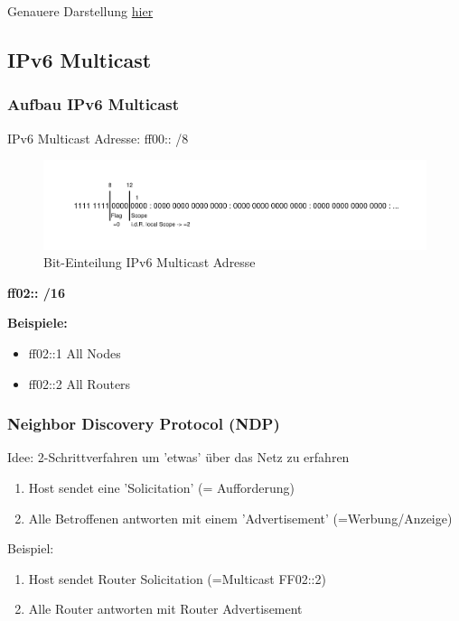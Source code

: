 \documentclass[10pt]{article}
\begin{document}
Genauere Darstellung \href{https://www.internex.at/de/toolbox/ipv6/ip6=fd00:1:2::/prefix=52/subnetNo=16}{hier}

\subsection{IPv6 Multicast}

\subsubsection{Aufbau IPv6 Multicast}

IPv6 Multicast Adresse: ff00:: /8



\begin{figure}[H]
	\includegraphics{multicast.pdf}
	\caption{Bit-Einteilung IPv6 Multicast Adresse}
\end{figure}

\textrightarrow\space \textbf{ff02:: /16} 

\textbf{Beispiele:}
\begin{itemize}
    \item ff02::1 \textrightarrow\space All Nodes
    \item ff02::2 \textrightarrow\space All Routers
\end{itemize}


\subsubsection{Neighbor Discovery Protocol (NDP)}

Idee: 2-Schrittverfahren um 'etwas' über das Netz zu erfahren
\begin{enumerate}
    \item Host sendet eine 'Solicitation' (= Aufforderung)
    \item Alle Betroffenen antworten mit einem 'Advertisement' (=Werbung/Anzeige)
\end{enumerate}

Beispiel:
\begin{enumerate}
    \item Host sendet Router Solicitation (=Multicast FF02::2)
    \item Alle Router antworten mit Router Advertisement
\end{enumerate}
\end{document}
